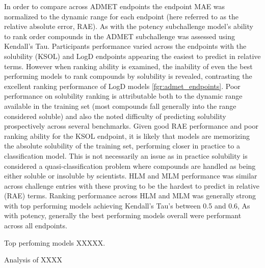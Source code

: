 \documentclass[journal=jcim,manuscript=article]{achemso}
\begin{document}
In order to compare across ADMET endpoints the endpoint MAE was normalized to the dynamic range for each endpoint (here referred to as the relative absolute error, RAE). As with the potency subchallenge model's ability to rank order compounds in the ADMET subchallenge was assessed using Kendall's Tau. Participants performance varied across the endpoints with the solubility (KSOL) and LogD endpoints appearing the easiest to predict in relative terms. However when ranking ability is examined, the inability of even the best performing models to rank compounds by solubility is revealed, contrasting the excellent ranking performance of LogD models \ref{fgr:admet_endpoints}.  Poor performance on solubility ranking is attributable both to the dynamic range available in the training set (most compounds fall generally into the range considered soluble) and also the noted difficulty of predicting solubility prospectively across several benchmarks. Given good RAE performance and poor ranking ability for the KSOL endpoint, it is likely that models are memorizing the absolute solubility of the training set, performing closer in practice to a classification model. This is not necessarily an issue as in practice solubility is considered a quasi-classification problem where compounds are handled as being either soluble or insoluble by scientists. HLM and MLM performance was similar across challenge entries with these proving to be the hardest to predict in relative (RAE) terms. Ranking performance across HLM and MLM was generally strong with top performing models achieving Kendall's Tau's between 0.5 and 0.6, As with potency, generally the best performing models overall were performant across all endpoints.

Top perfoming models XXXXX.


Analysis of XXXX
\end{document}
